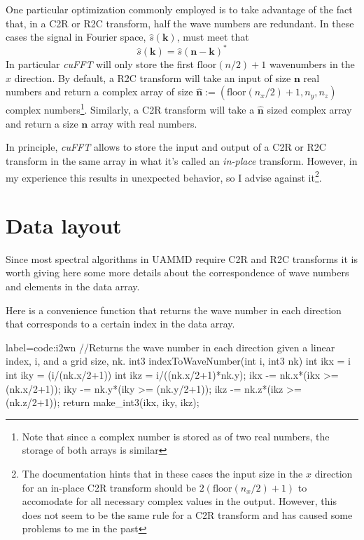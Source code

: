 \documentclass[ twoside,openright,titlepage,numbers=noenddot,%
headinclude,footinclude,cleardoublepage=empty,abstract=on,
BCOR=5mm,paper=a4,fontsize=11pt, dvipsnames
]{scrreprt}
\renewcommand{\vec}[1]{\bm{#1}}
\newcommand{\uammd}{\gls{UAMMD}\xspace}
\begin{document}
One particular optimization commonly employed is to take advantage of the fact that, in a C2R or R2C transform, half the wave numbers are redundant. In these cases the signal in Fourier space, $\hat{s}(\vec{k})$, must meet that
\begin{equation}
  \hat{s}(\vec{k}) = \hat{s}(\vec{n} - \vec{k})^*
\end{equation}
In particular \emph{cuFFT} will only store the first $\textrm{floor}(n/2)+1$ wavenumbers in the $x$ direction. By default, a R2C transform will take an input of size $\vec{n}$ real numbers and return a complex array of size $\hat{\vec{n}} := (\textrm{floor}(n_x/2)+1, n_y, n_z)$ complex numbers\footnote{Note that since a complex number is stored as of two real numbers, the storage of both arrays is similar}. Similarly, a C2R transform will take a $\hat{\vec{n}}$ sized complex array and return a size $\vec{n}$ array with real numbers.

In principle, \emph{cuFFT} allows to store the input and output of a C2R or R2C transform in the same array in what it's called an \emph{in-place} transform. However, in my experience this results in unexpected behavior, so I advise against it\footnote{The documentation hints that in these cases the input size in the $x$ direction for an in-place C2R transform should be $2(\textrm{floor}(n_x/2)+1)$ to accomodate for all necessary complex values in the output. However, this does not seem to be the same rule for a C2R transform and has caused some problems to me in the past}.

\section*{Data layout}
Since most spectral algorithms in \uammd require C2R and R2C transforms it is worth giving here some more details about the correspondence of wave numbers and elements in the data array.

Here is a convenience function that returns the wave number in each direction that corresponds to a certain index in the data array.
\begin{code2}{label=code:i2wn}
//Returns the wave number in each direction given a linear index, i, and a grid size, nk.
int3 indexToWaveNumber(int i, int3 nk){
  int ikx = i%
  int iky = (i/(nk.x/2+1))%
  int ikz = i/((nk.x/2+1)*nk.y);
  ikx -= nk.x*(ikx >= (nk.x/2+1));
  iky -= nk.y*(iky >= (nk.y/2+1));
  ikz -= nk.z*(ikz >= (nk.z/2+1));
  return make_int3(ikx, iky, ikz);
}
\end{code2}
\end{document}
